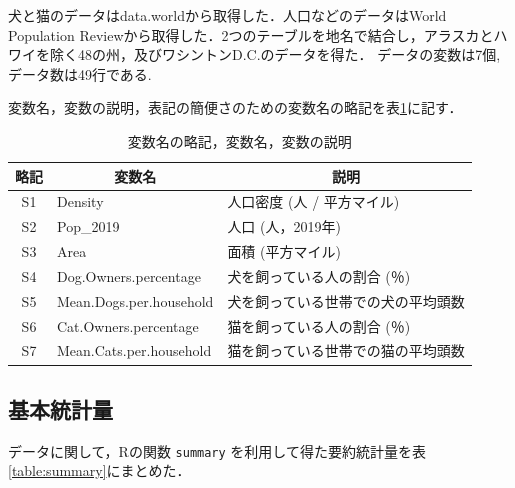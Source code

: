 \documentclass[11pt,dvipdfmx]{jarticle}
\theoremstyle{definition}
\begin{document}
犬と猫のデータはdata.world\cite{data_world}から取得した．人口などのデータはWorld Population Review\cite{world_population_review}から取得した．2つのテーブルを地名で結合し，アラスカとハワイを除く48の州，及びワシントンD.C.のデータを得た．
データの変数は7個, データ数は49行である.

変数名，変数の説明，表記の簡便さのための変数名の略記を表\ref{table:arribute-info}に記す．

\begin{table}[htbp]
    \caption{変数名の略記，変数名，変数の説明}
    \label{table:arribute-info}
    \begin{center}
        {\small
        \begin{tabular}{|c|ll|}
            \hline
            略記 & \multicolumn{1}{c}{変数名} & \multicolumn{1}{c|}{説明} \\ \hline
            S1 & Density                 & 人口密度 (人 / 平方マイル)        \\
            S2 & Pop\_2019               & 人口 (人，2019年)              \\
            S3 & Area                    & 面積 (平方マイル)              \\
            S4 & Dog.Owners.percentage   & 犬を飼っている人の割合 (％)           \\
            S5 & Mean.Dogs.per.household & 犬を飼っている世帯での犬の平均頭数       \\
            S6 & Cat.Owners.percentage   & 猫を飼っている人の割合 (％)         \\
            S7 & Mean.Cats.per.household & 猫を飼っている世帯での猫の平均頭数       \\ \hline
        \end{tabular}
    }
    \end{center}
\end{table}


\subsection{基本統計量}
データに関して，Rの関数 {\tt summary} を利用して得た要約統計量を表\ref{table:summary}にまとめた．
\end{document}
